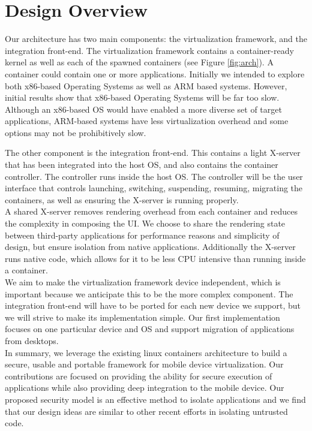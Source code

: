 \section{Design Overview}
\label{sec:overview}
Our architecture has two main components: the virtualization framework, and the integration front-end.  The virtualization framework contains a container-ready kernel as well as each of the spawned containers (see Figure \ref{fig:arch}).  A container could contain one or more applications.  Initially we intended to explore both x86-based Operating Systems as well as ARM based systems.  However, initial results show that x86-based Operating Systems will be far too slow.  Although an x86-based OS would have enabled a more diverse set of target applications, ARM-based systems have less virtualization overhead and some options may not be prohibitively slow.


The other component is the integration front-end. This contains a light X-server that has been integrated into the host OS, and also contains the container controller. The controller runs inside the host OS. The controller will be the user interface that controls launching, switching, suspending, resuming, migrating the containers, as well as ensuring the X-server is running properly. \\

A shared X-server removes rendering overhead from each container and reduces the complexity in composing the UI. We choose to share the rendering state between third-party applications for performance reasons and simplicity of design, but ensure isolation from native applications. Additionally the X-server runs native code, which allows for it to be less CPU intensive than running inside a container. \\

We aim to make the virtualization framework device independent, which is important because we anticipate this to be the more complex component. The integration front-end will have to be ported for each new device we support, but we will strive to make its implementation simple. Our first implementation focuses on one particular device and OS and support  migration of applications from desktops. \\

In summary, we leverage the existing linux containers architecture to build a secure, usable and portable framework for mobile device virtualization. Our contributions are focused on providing the ability for secure execution of applications while also providing deep integration to the mobile device. Our proposed security model is an effective method to isolate applications and we find that our design ideas are similar to other recent efforts \cite{grier2008secure} in isolating untrusted code. \\

